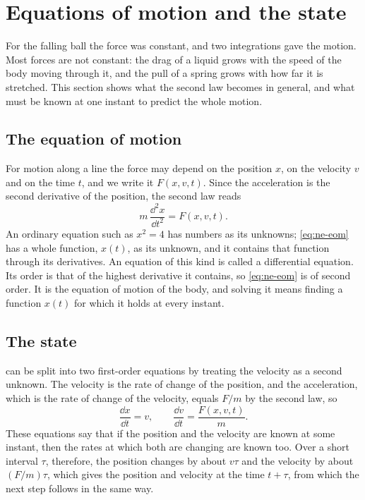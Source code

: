 \section{Equations of motion and the state}
\label{sec:ne-equations}

For the falling ball the force was constant, and two integrations gave
the motion. Most forces are not constant: the drag of a liquid grows with
the speed of the body moving through it, and the pull of a spring grows
with how far it is stretched. This section shows what the second law
becomes in general, and what must be known at one instant to predict the
whole motion.

\subsection*{The equation of motion}

For motion along a line the force may depend on the position $x$, on the
velocity $v$ and on the time $t$, and we write it $F(x, v, t)$. Since the
acceleration is the second derivative of the position, the second law
reads
\begin{equation}
   m\,\frac{\dd^2 x}{\dd t^2} = F(x, v, t) .
   \label{eq:ne-eom}
\end{equation}
An ordinary equation such as $x^2 = 4$ has numbers as its unknowns;
\cref{eq:ne-eom} has a whole function, $x(t)$, as its unknown, and it
contains that function through its derivatives. An equation of this kind
is called a differential equation. Its order is that of the highest
derivative it contains, so \cref{eq:ne-eom} is of second order. It is the
equation of motion of the body, and solving it means finding a function
$x(t)$ for which it holds at every instant.

\subsection*{The state}

 can be split into two first-order equations by treating
the velocity as a second unknown. The velocity is the rate of change of
the position, and the acceleration, which is the rate of change of the
velocity, equals $F/m$ by the second law, so
\begin{equation}
   \frac{\dd x}{\dd t} = v, \qquad
   \frac{\dd v}{\dd t} = \frac{F(x, v, t)}{m} .
   \label{eq:ne-first-order}
\end{equation}
These equations say that if the position and the velocity are known at
some instant, then the rates at which both are changing are known too.
Over a short interval $\tau$, therefore, the position changes by about
$v\tau$ and the velocity by about $(F/m)\tau$, which gives the position
and velocity at the time $t + \tau$, from which the next step follows in
the same way.

